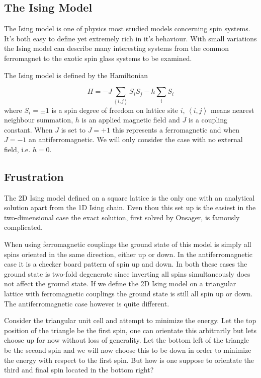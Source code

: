 \documentclass[paper=a4, fontsize=11pt]{scrartcl} %
\numberwithin{equation}{section} %
\numberwithin{figure}{section} %
\numberwithin{table}{section} %
\begin{document}
\subsection{The Ising Model}

The Ising model is one of physics most studied models concerning spin systems. It's both easy to define yet extremely rich in it's behaviour. With small variations the Ising model can describe many interesting systems from the common ferromagnet to the exotic spin glass systems to be examined.

The Ising model is defined by the Hamiltonian

\begin{equation}
H = -J \sum\limits_{\left\langle i,j \right\rangle} S_{i} S_{j} -h \sum\limits_{i} S_{i}
\end{equation}
where $S_{i} = \pm 1$ is a spin degree of freedom on lattice site $i$, $\left< i,j \right> $ means nearest neighbour summation, $h$ is an applied magnetic field and $J$ is a coupling
constant. When $J$ is set to $J=+1$ this represents a ferromagnetic and when $J=-1$ an antiferromagnetic. We will only consider the case with no external field, i.e. $h=0$.

\subsection{Frustration}
The 2D Ising model defined on a square lattice is the only one with an analytical solution apart from the 1D Ising chain. Even thou this set up is the easiest in the two-dimensional case the exact solution, first solved by Onsager, is famously complicated\cite{onsager}. 

When using ferromagnetic couplings the ground state of this model is simply all spins oriented in the same direction, either up or down. In the antiferromagnetic case it is a checker board pattern of spin up and down. In both these cases the ground state is  two-fold degenerate since inverting all spins simultaneously does not affect the ground state. If we define the 2D Ising model on a triangular lattice with ferromagnetic couplings the ground state is still all spin up or down. The antiferromagnetic case however is quite different.

Consider the triangular unit cell and attempt to minimize the energy. Let the top position of the triangle be the first spin, one can orientate this arbitrarily but lets choose up for now without loss of generality. Let the bottom left of the triangle be the second spin and we will now choose this to be down in order to minimize the energy with respect to the first spin. But how is one suppose to orientate the third and final spin located in the bottom right? 
\end{document}
